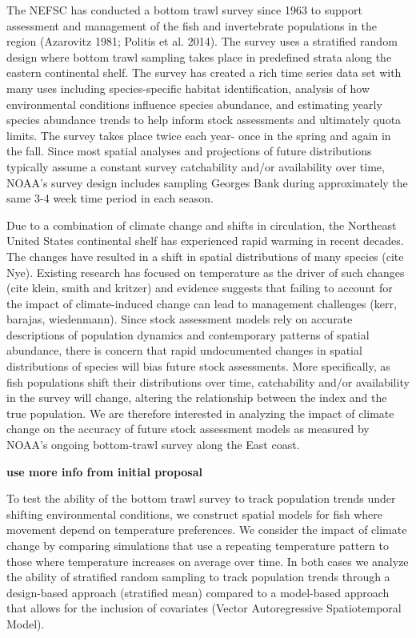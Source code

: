 \documentclass[
  12pt,
]{article}
\begin{document}
The NEFSC has conducted a bottom trawl survey since 1963 to support assessment and management of the fish and invertebrate populations in the region (Azarovitz 1981; Politis et al. 2014). The survey uses a stratified random design where bottom trawl sampling takes place in predefined strata along the eastern continental shelf. The survey has created a rich time series data set with many uses including species-specific habitat identification, analysis of how environmental conditions influence species abundance, and estimating yearly species abundance trends to help inform stock assessments and ultimately quota limits. The survey takes place twice each year- once in the spring and again in the fall. Since most spatial analyses and projections of future distributions typically assume a constant survey catchability and/or availability over time, NOAA's survey design includes sampling Georges Bank during approximately the same 3-4 week time period in each season.

Due to a combination of climate change and shifts in circulation, the Northeast United States continental shelf has experienced rapid warming in recent decades. The changes have resulted in a shift in spatial distributions of many species (cite Nye). Existing research has focused on temperature as the driver of such changes (cite klein, smith and kritzer) and evidence suggests that failing to account for the impact of climate-induced change can lead to management challenges (kerr, barajas, wiedenmann). Since stock assessment models rely on accurate descriptions of population dynamics and contemporary patterns of spatial abundance, there is concern that rapid undocumented changes in spatial distributions of species will bias future stock assessments. More specifically, as fish populations shift their distributions over time, catchability and/or availability in the survey will change, altering the relationship between the index and the true population. We are therefore interested in analyzing the impact of climate change on the accuracy of future stock assessment models as measured by NOAA's ongoing bottom-trawl survey along the East coast.

\textbf{use more info from initial proposal}

To test the ability of the bottom trawl survey to track population trends under shifting environmental conditions, we construct spatial models for fish where movement depend on temperature preferences. We consider the impact of climate change by comparing simulations that use a repeating temperature pattern to those where temperature increases on average over time. In both cases we analyze the ability of stratified random sampling to track population trends through a design-based approach (stratified mean) compared to a model-based approach that allows for the inclusion of covariates (Vector Autoregressive Spatiotemporal Model).
\end{document}
